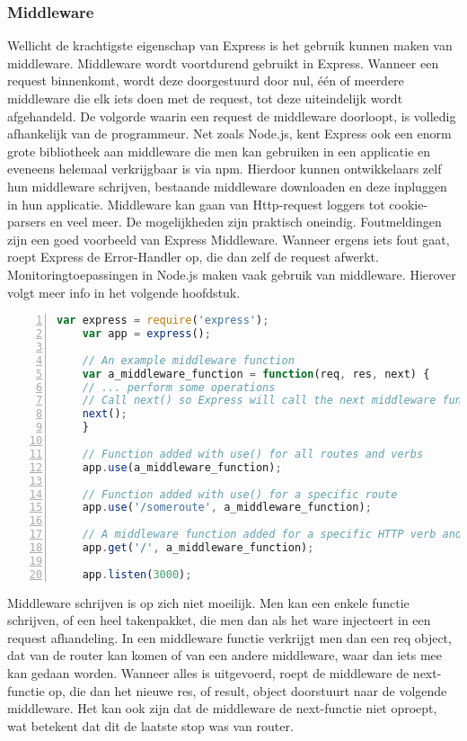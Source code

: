 \subsubsection{Middleware}
\label{sec:expressMiddleware}

Wellicht de krachtigste eigenschap van Express is het gebruik kunnen maken van middleware. Middleware wordt voortdurend gebruikt in Express. Wanneer een request binnenkomt, wordt deze doorgestuurd door nul, één of meerdere middleware die elk iets doen met de request, tot deze uiteindelijk wordt afgehandeld. De volgorde waarin een request de middleware doorloopt, is volledig afhankelijk van de programmeur. Net zoals Node.js, kent Express ook een enorm grote bibliotheek aan middleware die men kan gebruiken in een applicatie en eveneens helemaal verkrijgbaar is via npm. Hierdoor kunnen ontwikkelaars zelf hun middleware schrijven, bestaande middleware downloaden en deze inpluggen in hun applicatie. Middleware kan gaan van Http-request loggers tot cookie-parsers en veel meer. De mogelijkheden zijn praktisch oneindig. Foutmeldingen zijn een goed voorbeeld van Express Middleware. Wanneer ergens iets fout gaat, roept Express de Error-Handler op, die dan zelf de request afwerkt. Monitoringtoepassingen in Node.js maken vaak gebruik van middleware. Hierover volgt meer info in het volgende hoofdstuk.

	\begin{lstlisting}[language=JavaScript, breaklines=true,
						numbers=left, frame=single,
						caption={Express code flow voorbeeld.},
						label=code:expressexample]
	var express = require('express');
	var app = express();
	
	// An example middleware function
	var a_middleware_function = function(req, res, next) {
	// ... perform some operations
	// Call next() so Express will call the next middleware function in the chain.
	next();
	}
	
	// Function added with use() for all routes and verbs
	app.use(a_middleware_function);
	
	// Function added with use() for a specific route
	app.use('/someroute', a_middleware_function);
	
	// A middleware function added for a specific HTTP verb and route
	app.get('/', a_middleware_function);
	
	app.listen(3000);
	\end{lstlisting}
	
	
Middleware schrijven is op zich niet moeilijk. Men kan een enkele functie schrijven, of een heel takenpakket, die men dan als het ware injecteert in een request afhandeling. In een middleware functie verkrijgt men dan een req object, dat van de router kan komen of van een andere middleware, waar dan iets mee kan gedaan worden. Wanneer alles is uitgevoerd, roept de middleware de next-functie op, die dan het nieuwe res, of result, object doorstuurt naar de volgende middleware. Het kan ook zijn dat de middleware de next-functie niet oproept, wat betekent dat dit de laatste stop was van router. 

